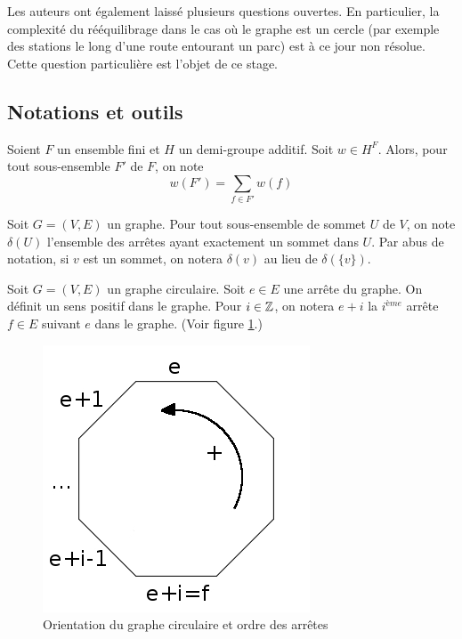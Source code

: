 \documentclass[twoside,11pt,openany,a4paper]{rapport}
\begin{document}
Les auteurs ont également laissé plusieurs questions ouvertes. En particulier, la complexité du rééquilibrage dans le cas où le graphe est un cercle (par exemple des stations le long d'une route entourant un parc) est à ce jour non résolue. Cette question particulière est l'objet de ce stage.

\subsection{Notations et outils}

Soient $F$ un ensemble fini et $H$ un demi-groupe additif. Soit $w \in H^F$. Alors, pour tout sous-ensemble $F'$ de $F$, on note $$w(F') = \sum_{f \in F'} w(f)$$

Soit $G=(V,E)$ un graphe. Pour tout sous-ensemble de sommet $U$ de $V$, on note $\delta(U)$ l'ensemble des arrêtes ayant exactement un sommet dans $U$. Par abus de notation, si $v$ est un sommet, on notera $\delta(v)$ au lieu de $\delta(\{v\})$.

Soit $G=(V,E)$ un graphe circulaire. Soit $e \in E$ une arrête du graphe. On définit un sens positif dans le graphe. Pour $i \in \mathbb{Z}$, on notera $e+i$ la $i^{ème}$ arrête $f \in E$ suivant $e$ dans le graphe. (Voir figure \ref{Notation orientation graphe circulaire}.)
\begin{figure}[ht]
  \centering
  \includegraphics[scale=0.5]{GrapheCirculaire_NotationOrientation.jpg}
  \caption{Orientation du graphe circulaire et ordre des arrêtes}
  \label{Notation orientation graphe circulaire}
\end{figure}
\end{document}
